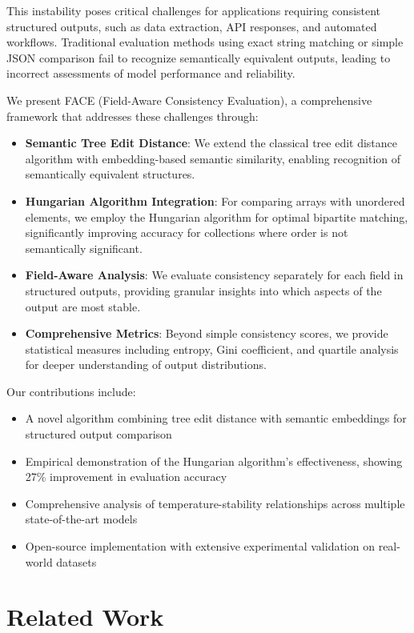 \documentclass[letterpaper]{article} %
\begin{document}
This instability poses critical challenges for applications requiring consistent structured outputs, such as data extraction, API responses, and automated workflows. Traditional evaluation methods using exact string matching or simple JSON comparison fail to recognize semantically equivalent outputs, leading to incorrect assessments of model performance and reliability.

We present FACE (Field-Aware Consistency Evaluation), a comprehensive framework that addresses these challenges through:

\begin{itemize}
\item \textbf{Semantic Tree Edit Distance}: We extend the classical tree edit distance algorithm with embedding-based semantic similarity, enabling recognition of semantically equivalent structures.
\item \textbf{Hungarian Algorithm Integration}: For comparing arrays with unordered elements, we employ the Hungarian algorithm for optimal bipartite matching, significantly improving accuracy for collections where order is not semantically significant.
\item \textbf{Field-Aware Analysis}: We evaluate consistency separately for each field in structured outputs, providing granular insights into which aspects of the output are most stable.
\item \textbf{Comprehensive Metrics}: Beyond simple consistency scores, we provide statistical measures including entropy, Gini coefficient, and quartile analysis for deeper understanding of output distributions.
\end{itemize}

Our contributions include:
\begin{itemize}
\item A novel algorithm combining tree edit distance with semantic embeddings for structured output comparison
\item Empirical demonstration of the Hungarian algorithm's effectiveness, showing 27\% improvement in evaluation accuracy
\item Comprehensive analysis of temperature-stability relationships across multiple state-of-the-art models
\item Open-source implementation with extensive experimental validation on real-world datasets
\end{itemize}

\section{Related Work}
\end{document}
